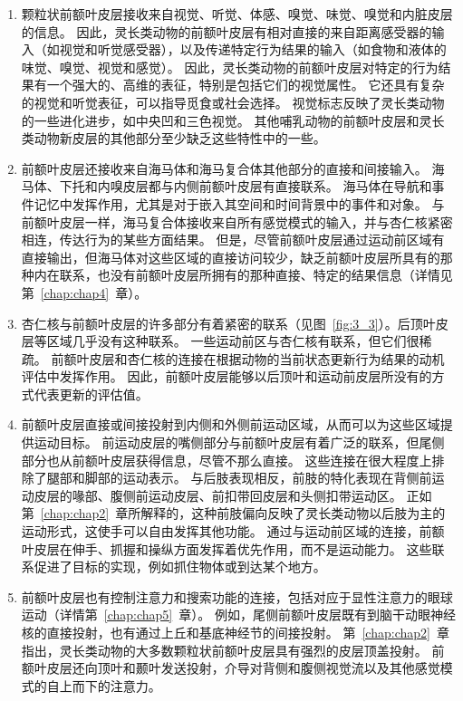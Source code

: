 \begin{enumerate}
\item 颗粒状前额叶皮层接收来自视觉、听觉、体感、嗅觉、味觉、嗅觉和内脏皮层的信息。
因此，灵长类动物的前额叶皮层有相对直接的来自距离感受器的输入（如视觉和听觉感受器），以及传递特定行为结果的输入（如食物和液体的味觉、嗅觉、视觉和感觉）。
因此，灵长类动物的前额叶皮层对特定的行为结果有一个强大的、高维的表征，特别是包括它们的视觉属性。
它还具有复杂的视觉和听觉表征，可以指导觅食或社会选择。
视觉标志反映了灵长类动物的一些进化进步，如中央凹和三色视觉。
其他哺乳动物的前额叶皮层和灵长类动物新皮层的其他部分至少缺乏这些特性中的一些。

\item 前额叶皮层还接收来自海马体和海马复合体其他部分的直接和间接输入。
海马体、下托和内嗅皮层都与内侧前额叶皮层有直接联系。
海马体在导航和事件记忆中发挥作用，尤其是对于嵌入其空间和时间背景中的事件和对象。
与前额叶皮层一样，海马复合体接收来自所有感觉模式的输入，并与杏仁核紧密相连，传达行为的某些方面结果。
但是，尽管前额叶皮层通过运动前区域有直接输出，但海马体对这些区域的直接访问较少，缺乏前额叶皮层所具有的那种内在联系，也没有前额叶皮层所拥有的那种直接、特定的结果信息（详情见第~\ref{chap:chap4}~章）。


\item 杏仁核与前额叶皮层的许多部分有着紧密的联系（见图~\ref{fig:3_3}）。后顶叶皮层等区域几乎没有这种联系。
一些运动前区与杏仁核有联系，但它们很稀疏\cite{avendan1983evidence}。
前额叶皮层和杏仁核的连接在根据动物的当前状态更新行为结果的动机评估中发挥作用。
因此，前额叶皮层能够以后顶叶和运动前皮层所没有的方式代表更新的评估值。

\item 前额叶皮层直接或间接投射到内侧和外侧前运动区域，从而可以为这些区域提供运动目标。
前运动皮层的嘴侧部分与前额叶皮层有着广泛的联系，但尾侧部分也从前额叶皮层获得信息，尽管不那么直接。
这些连接在很大程度上排除了腿部和脚部的运动表示。
与后肢表现相反，前肢的特化表现在背侧前运动皮层的喙部\cite{tachibana2004input}、腹侧前运动皮层\cite{he1993topographic}、前扣带回皮层\cite{luppino1991multiple}和头侧扣带运动区\cite{he1995topographic}。
正如第~\ref{chap:chap2}~章所解释的，这种前肢偏向反映了灵长类动物以后肢为主的运动形式，这使手可以自由发挥其他功能。
通过与运动前区域的连接，前额叶皮层在伸手、抓握和操纵方面发挥着优先作用，而不是运动能力。
这些联系促进了目标的实现，例如抓住物体或到达某个地方。


\item 前额叶皮层也有控制注意力和搜索功能的连接，包括对应于显性注意力的眼球运动（详情第~\ref{chap:chap5}~章）。
例如，尾侧前额叶皮层既有到脑干动眼神经核的直接投射，也有通过上丘和基底神经节的间接投射。
第~\ref{chap:chap2}~章指出，灵长类动物的大多数颗粒状前额叶皮层具有强烈的皮层顶盖投射\cite{leichnetz1981prefrontal}。
前额叶皮层还向顶叶和颞叶发送投射，介导对背侧和腹侧视觉流以及其他感觉模式的自上而下的注意力。



\end{enumerate}
